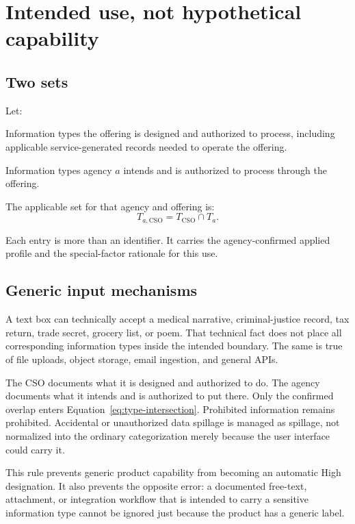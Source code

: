 \documentclass[11pt]{article}
\begin{document}
\section{Intended use, not hypothetical capability}

\subsection{Two sets}

Let:

\begin{description}[leftmargin=2.2em,style=nextline]
\item[$T_{\mathrm{CSO}}$] Information types the offering is designed and authorized
  to process, including applicable service-generated records needed to operate the
  offering.
\item[$T_a$] Information types agency $a$ intends and is authorized to process
  through the offering.
\end{description}

The applicable set for that agency and offering is:
\begin{equation}
T_{a,\mathrm{CSO}}=T_{\mathrm{CSO}}\cap T_a.
\label{eq:type-intersection}
\end{equation}

Each entry is more than an identifier. It carries the agency-confirmed applied
profile and the special-factor rationale for this use.

\subsection{Generic input mechanisms}

A text box can technically accept a medical narrative, criminal-justice record,
tax return, trade secret, grocery list, or poem. That technical fact does not place
all corresponding information types inside the intended boundary. The same is true
of file uploads, object storage, email ingestion, and general APIs.

The CSO documents what it is designed and authorized to do. The agency documents
what it intends and is authorized to put there. Only the confirmed overlap enters
Equation~\eqref{eq:type-intersection}. Prohibited information remains prohibited.
Accidental or unauthorized data spillage is managed as spillage, not normalized
into the ordinary categorization merely because the user interface could carry it.

This rule prevents generic product capability from becoming an automatic High
designation. It also prevents the opposite error: a documented free-text,
attachment, or integration workflow that is intended to carry a sensitive
information type cannot be ignored just because the product has a generic label.
\end{document}
